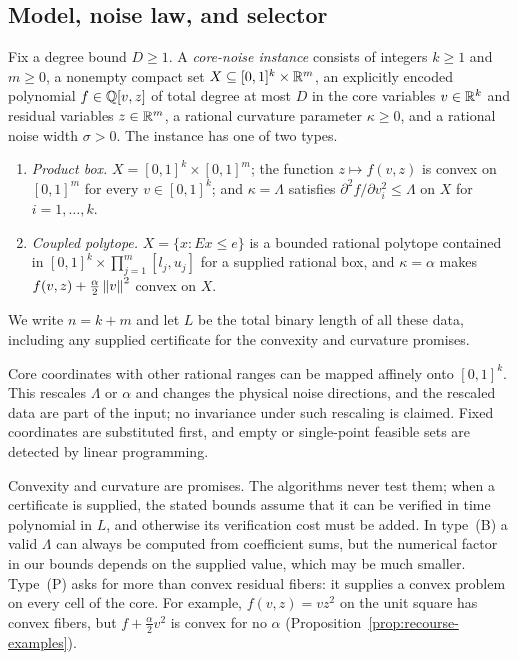 \subsection{Model, noise law, and selector}
\label{sec:recourse-model}

\begin{definition}
\label{def:recourse-instance}
Fix a degree bound $D\ge1$. A \emph{core-noise instance} consists of
integers $k\ge1$ and $m\ge0$, a nonempty compact set
$X\subseteq[0,1]^k\times\mathbb R^m$, an explicitly encoded polynomial
$f\in\mathbb Q[v,z]$ of total degree at most $D$ in the core variables
$v\in\mathbb R^k$ and residual variables $z\in\mathbb R^m$, a rational curvature
parameter $\kappa\ge0$, and a rational noise width $\sigma>0$. The
instance has one of two types.
\begin{enumerate}[label=(\Alph*)]
\item[(B)] \emph{Product box.} $X=[0,1]^k\times[0,1]^m$; the function
$z\mapsto f(v,z)$ is convex on $[0,1]^m$ for every $v\in[0,1]^k$; and
$\kappa=\Lambda$ satisfies $\partial^2f/\partial v_i^2\le\Lambda$ on
$X$ for $i=1,\ldots,k$.
\item[(P)] \emph{Coupled polytope.} $X=\{x:Ex\le e\}$ is a bounded
rational polytope contained in $[0,1]^k\times\prod_{j=1}^m[l_j,u_j]$
for a supplied rational box, and $\kappa=\alpha$ makes
$f(v,z)+\frac\alpha2\left\lVert v\right\rVert^2$ convex on $X$.
\end{enumerate}
We write $n=k+m$ and let $L$ be the total binary length of all these
data, including any supplied certificate for the convexity and
curvature promises.
\end{definition}

Core coordinates with other rational ranges can be mapped affinely onto
$[0,1]^k$. This rescales $\Lambda$ or $\alpha$ and changes the physical
noise directions, and the rescaled data are part of the input; no
invariance under such rescaling is claimed. Fixed coordinates are
substituted first, and empty or single-point feasible sets are detected
by linear programming.

Convexity and curvature are promises. The algorithms never test them;
when a certificate is supplied, the stated bounds assume that it can be
verified in time polynomial in $L$, and otherwise its verification cost
must be added. In type~(B) a valid $\Lambda$ can always be computed from
coefficient sums, but the numerical factor in our bounds depends on the
supplied value, which may be much smaller. Type~(P) asks for more than
convex residual fibers: it supplies a convex problem on every cell of
the core. For example, $f(v,z)=vz^2$ on the unit square has convex
fibers, but $f+\frac\alpha2v^2$ is convex for no $\alpha$
(Proposition~\ref{prop:recourse-examples}).


